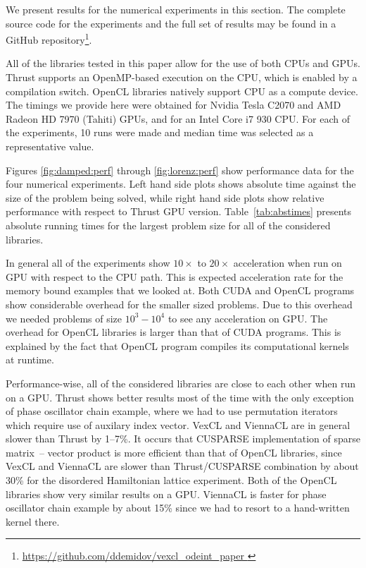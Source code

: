 \documentclass[1p]{elsarticle}
\begin{document}
We present results for the numerical experiments in this section. The complete
source code for the experiments and the full set of results may be found in a
GitHub repository\footnote{ \href{
https://github.com/ddemidov/vexcl_odeint_paper } {
https://github.com/ddemidov/vexcl\_odeint\_paper } }.


All of the libraries tested in this paper allow for the use of both CPUs and
GPUs.  Thrust supports an OpenMP-based execution on the CPU, which is enabled
by a compilation switch. OpenCL libraries natively support CPU as a compute
device.  The timings we provide here were obtained for Nvidia Tesla C2070 and
AMD Radeon HD 7970 (Tahiti) GPUs, and for an Intel Core i7 930 CPU. For each of
the experiments, 10 runs were made and median time was selected as a
representative value.

Figures \ref{fig:damped:perf} through \ref{fig:lorenz:perf} show performance
data for the four numerical experiments. Left hand side plots shows absolute
time against the size of the problem being solved, while right hand side plots
show relative performance with respect to Thrust GPU version.
Table~\ref{tab:abstimes} presents absolute running times for the largest
problem size for all of the considered libraries.


In general all of the experiments show $10\times$ to $20\times$ acceleration
when run on GPU with respect to the CPU path. This is expected acceleration
rate for the memory bound examples that we looked at. Both CUDA and OpenCL
programs show considerable overhead for the smaller sized problems.  Due to
this overhead we needed problems of size $10^3-10^4$ to see any acceleration on
GPU. The overhead for OpenCL libraries is larger than that of CUDA programs.
This is explained by the fact that OpenCL program compiles its computational
kernels at runtime.

Performance-wise, all of the considered libraries are close to each other when
run on a GPU.  Thrust shows better results most of the time with the only
exception of phase oscillator chain example, where we had to use permutation
iterators which require use of auxilary index vector. VexCL and ViennaCL are in
general slower than Thrust by 1--7\%. It occurs that CUSPARSE implementation of
sparse matrix~-- vector product is more efficient than that of OpenCL
libraries, since VexCL and ViennaCL are slower than Thrust/CUSPARSE combination
by about 30\% for the disordered Hamiltonian lattice experiment. Both of the
OpenCL libraries show very similar results on a GPU.  ViennaCL is faster for
phase oscillator chain example by about 15\% since we had to resort to a
hand-written kernel there.
\end{document}
